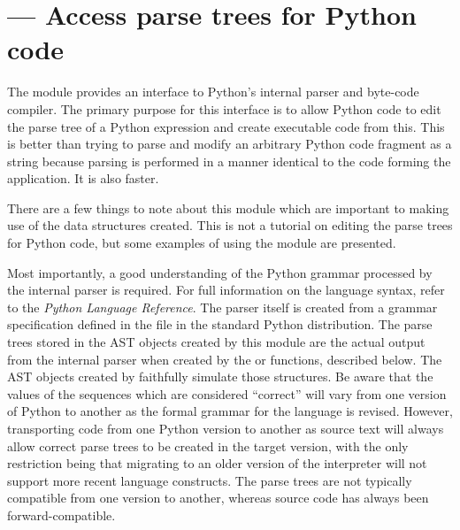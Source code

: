 %
%

\section{ ---
         Access parse trees for Python code}




The  module provides an interface to Python's internal
parser and byte-code compiler.  The primary purpose for this interface
is to allow Python code to edit the parse tree of a Python expression
and create executable code from this.  This is better than trying
to parse and modify an arbitrary Python code fragment as a string
because parsing is performed in a manner identical to the code
forming the application.  It is also faster.

There are a few things to note about this module which are important
to making use of the data structures created.  This is not a tutorial
on editing the parse trees for Python code, but some examples of using
the  module are presented.

Most importantly, a good understanding of the Python grammar processed
by the internal parser is required.  For full information on the
language syntax, refer to the \emph{Python Language Reference}.  The
parser itself is created from a grammar specification defined in the file
 in the standard Python distribution.  The parse
trees stored in the AST objects created by this module are the
actual output from the internal parser when created by the
 or  functions, described below.  The AST
objects created by  faithfully simulate those
structures.  Be aware that the values of the sequences which are
considered ``correct'' will vary from one version of Python to another
as the formal grammar for the language is revised.  However,
transporting code from one Python version to another as source text
will always allow correct parse trees to be created in the target
version, with the only restriction being that migrating to an older
version of the interpreter will not support more recent language
constructs.  The parse trees are not typically compatible from one
version to another, whereas source code has always been
forward-compatible.

